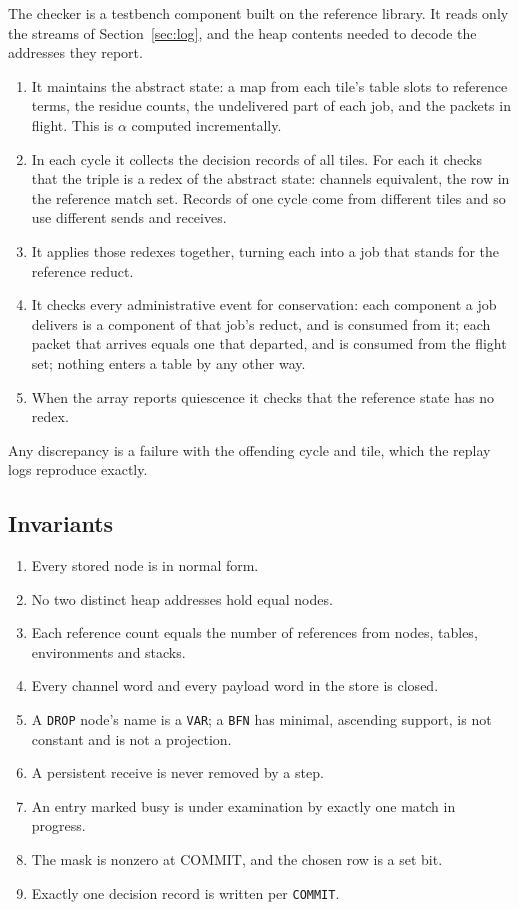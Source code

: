 \documentclass[10.5pt,a4paper]{extarticle}
\newcommand{\kw}[1]{\texttt{#1}}
\theoremstyle{definition}
\theoremstyle{remark}
\begin{document}
The checker is a testbench component built on the reference library. It reads
only the streams of Section~\ref{sec:log}, and the heap contents needed to
decode the addresses they report.
\begin{enumerate}
\item It maintains the abstract state: a map from each tile's table slots to
reference terms, the residue counts, the undelivered part of each job, and
the packets in flight. This is $\alpha$ computed incrementally.
\item In each cycle it collects the decision records of all tiles. For each
it checks that the triple is a redex of the abstract state: channels
equivalent, the row in the reference match set. Records of one cycle come
from different tiles and so use different sends and receives.
\item It applies those redexes together, turning each into a job that stands
for the reference reduct.
\item It checks every administrative event for conservation: each component
a job delivers is a component of that job's reduct, and is consumed from it;
each packet that arrives equals one that departed, and is consumed from the
flight set; nothing enters a table by any other way.
\item When the array reports quiescence it checks that the reference state
has no redex.
\end{enumerate}
Any discrepancy is a failure with the offending cycle and tile, which the
replay logs reproduce exactly.

\subsection{Invariants}\label{sec:invariants}

\begin{enumerate}[label=I\arabic*.]
\item Every stored node is in normal form.
\item No two distinct heap addresses hold equal nodes.
\item Each reference count equals the number of references from nodes,
tables, environments and stacks.
\item Every channel word and every payload word in the store is closed.
\item A \kw{DROP} node's name is a \kw{VAR}; a \kw{BFN} has minimal,
ascending support, is not constant and is not a projection.
\item A persistent receive is never removed by a step.
\item An entry marked busy is under examination by exactly one match in
progress.
\item The mask is nonzero at COMMIT, and the chosen row is a set bit.
\item Exactly one decision record is written per \kw{COMMIT}.
\end{enumerate}
\end{document}
